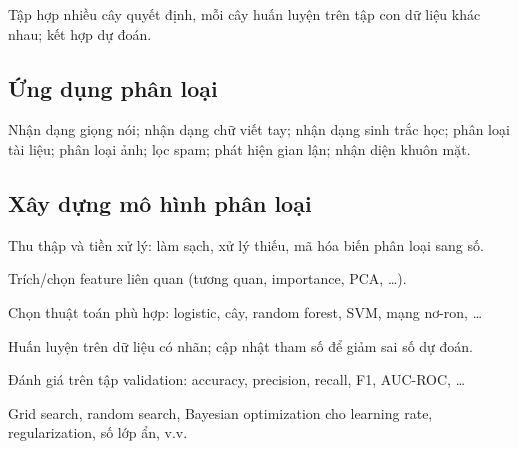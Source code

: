 \begin{ynghia}[title={Random Forest}]
Tập hợp nhiều cây quyết định, mỗi cây huấn luyện trên tập con dữ liệu khác nhau; kết hợp dự đoán.
\end{ynghia}

\subsection{Ứng dụng phân loại}

\begin{phuongphap}[title={Ứng dụng quan trọng}]
Nhận dạng giọng nói; nhận dạng chữ viết tay; nhận dạng sinh trắc học; phân loại tài liệu; phân loại ảnh; lọc spam; phát hiện gian lận; nhận diện khuôn mặt.
\end{phuongphap}

\subsection{Xây dựng mô hình phân loại}

\begin{phuongphap}[title={Bước 1: Chuẩn bị dữ liệu}]
Thu thập và tiền xử lý: làm sạch, xử lý thiếu, mã hóa biến phân loại sang số.
\end{phuongphap}

\begin{phuongphap}[title={Bước 2: Trích chọn feature}]
Trích/chọn feature liên quan (tương quan, importance, PCA, \ldots).
\end{phuongphap}

\begin{phuongphap}[title={Bước 3: Chọn mô hình}]
Chọn thuật toán phù hợp: logistic, cây, random forest, SVM, mạng nơ-ron, \ldots
\end{phuongphap}

\begin{phuongphap}[title={Bước 4: Huấn luyện}]
Huấn luyện trên dữ liệu có nhãn; cập nhật tham số để giảm sai số dự đoán.
\end{phuongphap}

\begin{phuongphap}[title={Bước 5: Đánh giá}]
Đánh giá trên tập validation: accuracy, precision, recall, F1, AUC-ROC, \ldots
\end{phuongphap}

\begin{phuongphap}[title={Bước 6: Tinh chỉnh hyperparameter}]
Grid search, random search, Bayesian optimization cho learning rate, regularization, số lớp ẩn, v.v.
\end{phuongphap}

